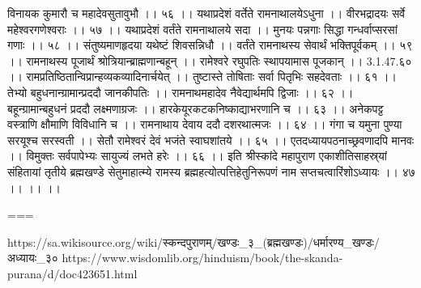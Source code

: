 विनायक कुमारौ च महादेवसुतावुभौ ।। ५६ ।।
यथाप्रदेशं वर्तेते रामनाथालयेऽधुना ।।
वीरभद्रादयः सर्वे महेश्वरगणेश्वराः ।। ५७ ।।
यथाप्रदेशं वर्तंते रामनाथालये सदा ।।
मुनयः पन्नगाः सिद्धा गन्धर्वाप्सरसां गणाः ।। ५८ ।।
संतुष्यमाणहृदया यथेष्टं शिवसन्निधौ ।।
वर्तंते रामनाथस्य सेवार्थं भक्तिपूर्वकम् ।। ५९ ।।
रामनाथस्य पूजार्थं श्रोत्रियान्ब्राह्मणान्बहून् ।।
रामेश्वरे रघुपतिः स्थापयामास पूजकान् ।। 3.1.47.६० ।।
रामप्रतिष्ठितान्विप्रान्हव्यकव्यादिनार्चयेत् ।।
तुष्टास्ते तोषिताः सर्वा पितृभिः सहदेवताः ।। ६१ ।।
तेभ्यो बहुधनान्ग्रामान्प्रददौ जानकीपतिः ।।
रामनाथमहादेव नैवेद्यार्थमपि द्विजाः ।। ६२ ।।
बहून्ग्रामान्बहुधनं प्रददौ लक्ष्मणाग्रजः ।।
हारकेयूरकटकनिष्काद्याभरणानि च ।। ६३ ।।
अनेकपट्ट वस्त्राणि क्षौमाणि विविधानि च ।।
रामनाथाय देवाय ददौ दशरथात्मजः ।। ६४ ।।
गंगा च यमुना पुण्या सरयूश्च सरस्वती ।।
सेतौ रामेश्वरं देवं भजंते स्वाघशांतये ।। ६५ ।।
एतदध्यायपठनाच्छ्रवणादपि मानवः ।।
विमुक्तः सर्वपापेभ्यः सायुज्यं लभते हरेः ।। ६६ ।।
इति श्रीस्कांदे महापुराण एकाशीतिसाहस्र्यां संहितायां तृतीये ब्रह्मखण्डे सेतुमाहात्म्ये रामस्य ब्रह्महत्योत्पत्तिहेतुनिरूपणं नाम सप्तचत्वारिंशोऽध्यायः ।। ४७ ।। ।। ।।

===

https://sa.wikisource.org/wiki/स्कन्दपुराणम्/खण्डः_३_(ब्रह्मखण्डः)/धर्मारण्य_खण्डः/अध्यायः_३०
https://www.wisdomlib.org/hinduism/book/the-skanda-purana/d/doc423651.html

